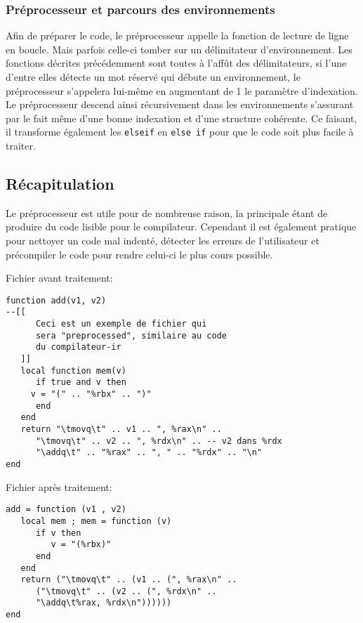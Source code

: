 \documentclass{article}
\begin{document}
\subsubsection{Préprocesseur et parcours des environnements}
Afin de préparer le code, le préprocesseur appelle la fonction de lecture de ligne en boucle. Mais parfois celle-ci tomber sur un délimitateur d'environnement. Les fonctions décrites précédemment sont toutes à l'affût des délimitateurs, si l'une d'entre elles détecte un mot réservé qui débute un environnement, le préprocesseur s'appelera lui-même en augmentant de 1 le paramètre d'indexation. Le préprocesseur descend ainsi récursivement dans les environnements s'assurant par le fait même d'une bonne indexation et d'une structure cohérente. Ce faisant, il transforme également les {\lstset{style=lua}\lstinline$elseif$} en {\lstset{style=lua}\lstinline$else if$} pour que le code soit plus facile à traiter.

\newpage
\subsection{Récapitulation}
Le préprocesseur est utile pour de nombreuse raison, la principale étant de produire du code lisible pour le compilateur. Cependant il est également pratique pour nettoyer un code mal indenté, détecter les erreurs de l'utilisateur et précompiler le code pour rendre celui-ci le plus cours possible.

Fichier avant traitement:
\begin{lstlisting}[caption={Récapitulatif des fonctionnalitées},label=DescriptiveLabel]
function add(v1, v2)
--[[ 
      Ceci est un exemple de fichier qui 
      sera "preprocessed", similaire au code
      du compilateur-ir
   ]]
   local function mem(v)
      if true and v then
	 v = "(" .. "%rbx" .. ")"
      end
   end
   return "\tmovq\t" .. v1 .. ", %rax\n" ..
      "\tmovq\t" .. v2 .. ", %rdx\n" .. -- v2 dans %rdx
      "\addq\t" .. "%rax" .. ", " .. "%rdx" .. "\n"
end
\end{lstlisting}

Fichier après traitement:
\begin{lstlisting}[belowcaptionskip = -1\baselineskip]
add = function (v1 , v2) 
   local mem ; mem = function (v) 
      if v then 
         v = "(%rbx)" 
      end 
   end 
   return ("\tmovq\t" .. (v1 .. (", %rax\n" .. 
      ("\tmovq\t" .. (v2 .. (", %rdx\n" .. 
      "\addq\t%rax, %rdx\n")))))) 
end 
\end{lstlisting}
\end{document}
